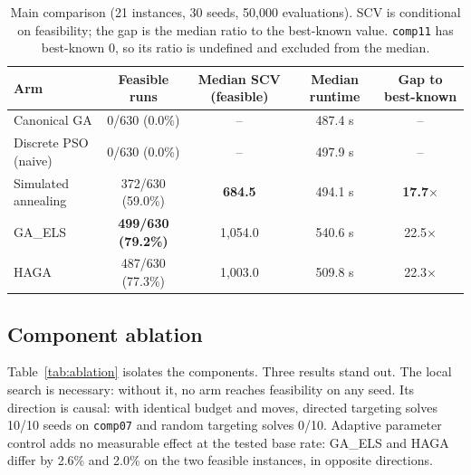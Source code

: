 \documentclass[journal]{IEEEtran}
\newcommand{\code}[1]{\texttt{#1}}
\begin{document}
\begin{table}[!t]
\caption{Main comparison (21 instances, 30 seeds, 50{,}000 evaluations). SCV is conditional on feasibility; the gap is the median ratio to the best-known value. \code{comp11} has best-known $0$, so its ratio is undefined and excluded from the median.}
\label{tab:main}
\centering
\small
\begin{tabular}{l c c c c}
\toprule
Arm & Feasible runs & Median SCV (feasible) & Median runtime & Gap to best-known \\
\midrule
Canonical GA          & 0/630 (0.0\%) & -- & 487.4 s & -- \\
Discrete PSO (naive)  & 0/630 (0.0\%) & -- & 497.9 s & -- \\
Simulated annealing   & 372/630 (59.0\%) & \textbf{684.5} & 494.1 s & \textbf{17.7}$\times$ \\
GA\_ELS               & \textbf{499/630 (79.2\%)} & 1{,}054.0 & 540.6 s & 22.5$\times$ \\
HAGA                  & 487/630 (77.3\%) & 1{,}003.0 & 509.8 s & 22.3$\times$ \\
\bottomrule
\end{tabular}
\end{table}

\subsection{Component ablation}
Table~\ref{tab:ablation} isolates the components. Three results stand out. The local search is necessary: without it, no arm reaches feasibility on any seed. Its direction is causal: with identical budget and moves, directed targeting solves 10/10 seeds on \code{comp07} and random targeting solves 0/10. Adaptive parameter control adds no measurable effect at the tested base rate: GA\_ELS and HAGA differ by 2.6\% and 2.0\% on the two feasible instances, in opposite directions.
\end{document}
